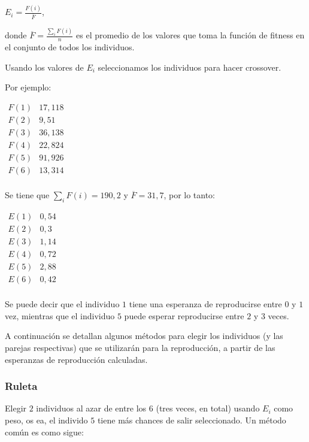\documentclass[10pt,a4paper]{article}
\begin{document}
\begin{center}
$E_i = \frac{F(i)}{\overline{F}}$,
\end{center}

donde $\overline{F} =\frac{\sum\limits_{i} F(i)}{n}$ es el promedio de los valores que toma la función de fitness en el conjunto de todos los individuos.

Usando los valores de $E_i$ seleccionamos los individuos para hacer crossover.

Por ejemplo:

\begin{center}
$\begin{array}{c|r} F(1) & 17,118\\ F(2) &9,51\\ F(3) &36,138\\ F(4) &22,824\\ F(5)&91,926\\ F(6)&13,314\\ \end{array}$
\end{center}

Se tiene que $\sum\limits_{i}F(i) = 190,2$ y $\overline{F} = 31, 7$, por lo tanto:

\begin{center}
$\begin{array}{c|r} E(1) &0,54\\ E(2) & 0,3\\ E(3) & 1,14\\ E(4) & 0,72\\ E(5)& 2,88\\ E(6)& 0,42\\ \end{array}$
\end{center}

Se puede decir que el individuo $1$ tiene una esperanza de reproducirse entre $0$ y $1$ vez, mientras que el individuo $5$ puede esperar reproducirse entre $2$ y $3$ veces.

A continuación se detallan algunos métodos para elegir los individuos (y las parejas respectivas) que se utilizarán para la reproducción, a partir de las esperanzas de reproducción calculadas.

\subsubsection*{Ruleta}

Elegir $2$ individuos al azar de entre los $6$ (tres veces, en total) usando $E_i$ como peso, os ea, el individo $5$ tiene más chances de salir seleccionado. Un método común es como sigue:
\end{document}

